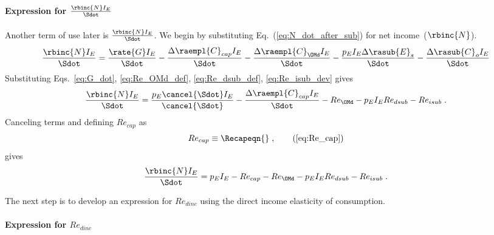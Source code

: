 \paragraph{Expression for $\frac{\rbinc{N} I_E}{\Sdot}$}
\label{sec:N_dot_hat_I_E_over_Sdot}

Another term of use later is $\frac{\rbinc{N} I_E}{\Sdot}$.
We begin by substituting Eq.~(\ref{eq:N_dot_after_sub}) for net income~($\rbinc{N}$).
%
\begin{equation}
  \frac{\rbinc{N} I_E}{\Sdot} = \frac{\rate{G} I_E}{\Sdot}
                                - \frac{\Delta \raempl{C}_{cap} I_E}{\Sdot}
                                - \frac{\Delta \raempl{C}_{\OMd} I_E}{\Sdot}
                                - \frac{p_E I_E \Delta \rasub{E}_s}{\Sdot}
                                - \frac{\Delta \rasub{C}_o I_E}{\Sdot}
\end{equation}
%
Substituting Eqs.~\ref{eq:G_dot}, \ref{eq:Re_OMd_def}, \ref{eq:Re_dsub_def}, \ref{eq:Re_isub_dev} gives
%
\begin{equation}
  \frac{\rbinc{N} I_E}{\Sdot} = \frac{p_E \cancel{\Sdot} I_E}{\cancel{\Sdot}}
                                - \frac{\Delta \raempl{C}_{cap} I_E}{\Sdot}
                                - Re_{\OMd}
                                - p_E I_E Re_{dsub}
                                - Re_{isub} \; .
\end{equation}
%
Canceling terms and defining $Re_{cap}$ as
%
\begin{equation}
  Re_{cap} \equiv \Recapeqn{} \; , \tag{\ref{eq:Re_cap}}
\end{equation}
%
gives
%
\begin{equation} \label{eq:N_dot_I_E_Sdot}
  \frac{\rbinc{N} I_E}{\Sdot} = p_E I_E
                                - Re_{cap}
                                - Re_{\OMd}
                                - p_E I_E Re_{dsub}
                                - Re_{isub} \; .
\end{equation}

The next step is to develop an expression for $Re_{dinc}$
using the direct income elasticity of consumption.


\paragraph{Expression for $Re_{dinc}$}
\label{sec:Re_dinc}

